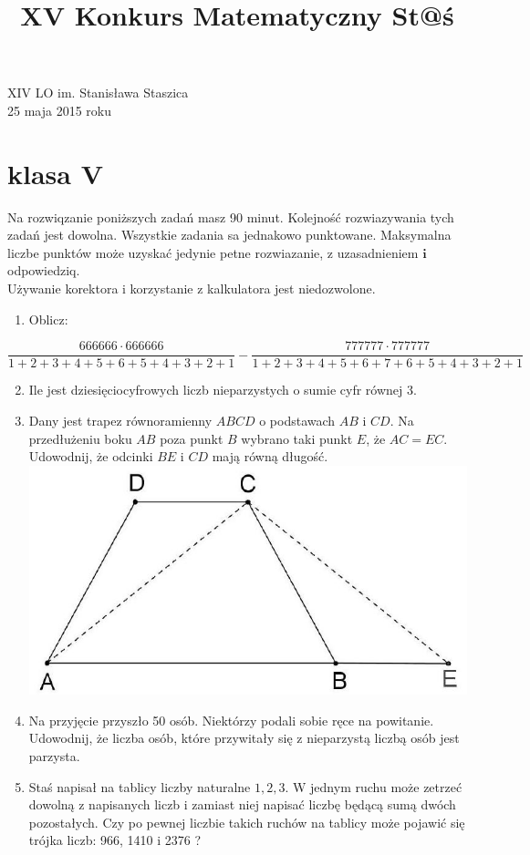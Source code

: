 \documentclass[10pt]{article}
\title{XV Konkurs Matematyczny St@ś }
\author{}
\date{}
\begin{document}
\maketitle
XIV LO im. Stanisława Staszica\\
25 maja 2015 roku

\section*{klasa V}
Na rozwiqzanie poniższych zadań masz 90 minut. Kolejność rozwiazywania tych zadań jest dowolna. Wszystkie zadania sa jednakowo punktowane. Maksymalna liczbe punktów może uzyskać jedynie petne rozwiazanie, z uzasadnieniem \(\boldsymbol{i}\) odpowiedziq.\\
Używanie korektora i korzystanie z kalkulatora jest niedozwolone.

\begin{enumerate}
  \item Oblicz:
\end{enumerate}

\[
\frac{666666 \cdot 666666}{1+2+3+4+5+6+5+4+3+2+1}-\frac{777777 \cdot 777777}{1+2+3+4+5+6+7+6+5+4+3+2+1}
\]

\begin{enumerate}
  \setcounter{enumi}{1}
  \item Ile jest dziesięciocyfrowych liczb nieparzystych o sumie cyfr równej 3.
  \item Dany jest trapez równoramienny \(A B C D\) o podstawach \(A B\) i \(C D\). Na przedłużeniu boku \(A B\) poza punkt \(B\) wybrano taki punkt \(E\), że \(A C=E C\). Udowodnij, że odcinki \(B E\) i \(C D\) mają równą długość.\\
\includegraphics[max width=\textwidth, center]{2024_11_21_bddaf9af0be1a5c8781bg-1}
  \item Na przyjęcie przyszło 50 osób. Niektórzy podali sobie ręce na powitanie. Udowodnij, że liczba osób, które przywitały się z nieparzystą liczbą osób jest parzysta.
  \item Staś napisał na tablicy liczby naturalne \(1,2,3\). W jednym ruchu może zetrzeć dowolną z napisanych liczb i zamiast niej napisać liczbę będącą sumą dwóch pozostałych. Czy po pewnej liczbie takich ruchów na tablicy może pojawić się trójka liczb: 966, 1410 i 2376 ?
\end{enumerate}
\end{document}
